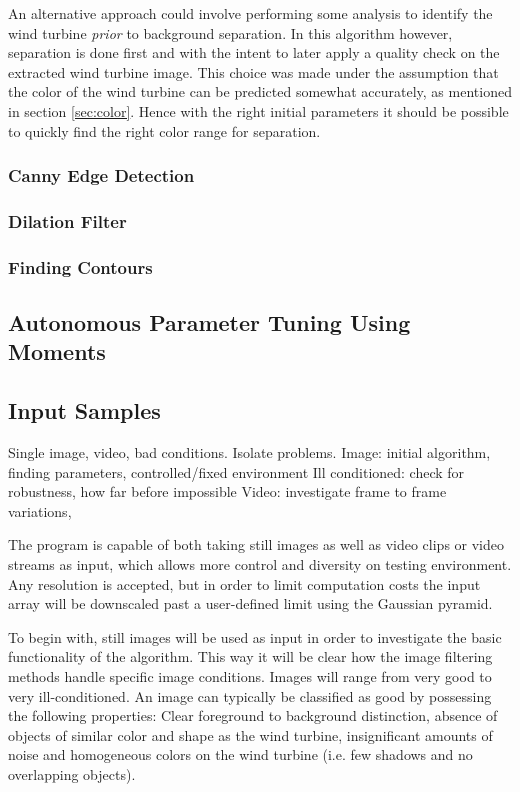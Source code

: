 \documentclass[a4paper,10pt]{article}
\begin{document}
    
    An alternative approach could involve performing some analysis to identify the wind turbine \emph{prior} to background separation. In this algorithm however, separation is done first and with the intent to later apply a quality check on the extracted wind turbine image. This choice was made under the assumption that the color of the wind turbine can be predicted somewhat accurately, as mentioned in section \ref{sec:color}. Hence with the right initial parameters it should be possible to quickly find the right color range for separation.
    
     
      
      
    \subsubsection{Canny Edge Detection}
    \subsubsection{Dilation Filter}
    \subsubsection{Finding Contours}
  \subsection{Autonomous Parameter Tuning Using Moments}
  \subsection{Input Samples}
  Single image, video, bad conditions. Isolate problems.
  Image: initial algorithm, finding parameters, controlled/fixed environment
  Ill conditioned: check for robustness, how far before impossible
  Video: investigate frame to frame variations,
  
  The program is capable of both taking still images as well as video clips or video streams as input,
  which allows more control and diversity on testing environment. Any resolution is accepted, but in
  order to limit computation costs the input array will be downscaled past a user-defined limit using
  the Gaussian pyramid.
  
  To begin with, still images will be used as input in order to investigate the basic functionality of the algorithm. 
  This way it will be clear how the image filtering methods handle specific image conditions. Images will range from very good to very ill-conditioned. An image can typically be classified as good by possessing the following properties: Clear foreground to background distinction, absence of objects of similar color and shape as the wind turbine,
  insignificant amounts of noise and homogeneous colors on the wind turbine (i.e. few shadows and
  no overlapping objects). 
  
\end{document}
